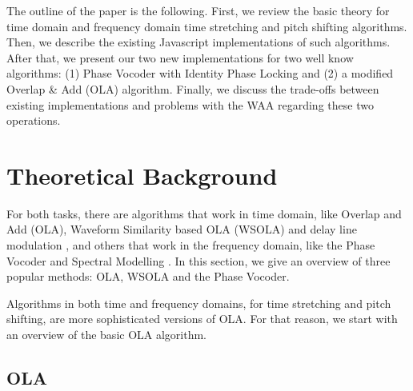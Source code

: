 \documentclass{sig-alternate}
\begin{document}
The outline of the paper is the following. First, we review the basic theory for time domain and frequency domain time stretching and pitch shifting algorithms. Then, we describe the existing Javascript implementations of such algorithms. After that, we present our two new implementations for two well know algorithms: (1) Phase Vocoder with Identity Phase Locking \cite{laroche:phasinessbusiness} and (2) a modified Overlap \& Add (OLA) algorithm. Finally, we discuss the trade-offs between existing implementations and problems with the WAA regarding these two operations.

\section{Theoretical Background}

For both tasks, there are algorithms that work in time domain, like Overlap and Add (OLA), Waveform Similarity based OLA (WSOLA) \cite{verhelst:wsola93} and delay line modulation \cite{modulationline:pitchshift}, and others that work in the frequency domain, like the Phase Vocoder \cite{dolsontutorial:phasevocoder} and Spectral Modelling \cite{dafx:2nd}. In this section, we give an overview of three popular methods: OLA, WSOLA and the Phase Vocoder.

Algorithms in both time and frequency domains, for time stretching and pitch shifting, are more sophisticated versions of OLA. For that reason, we start with an overview of the basic OLA algorithm.

\subsection{OLA}
\end{document}
